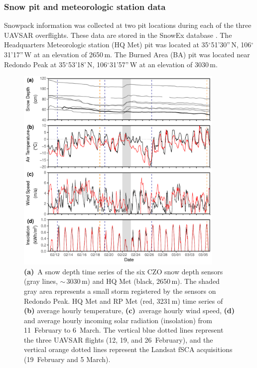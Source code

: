 \hypertarget{ch3-methods-8}{\subsubsection{Snow pit and meteorologic station data}\label{ch3-methods-8}}


Snowpack information was collected at two pit locations during each of the three UAVSAR overflights. These data are stored in the SnowEx database \citep{johnsonSnowExSnowexDb2023}. The Headquarters Meteorologic station (HQ Met) pit was located at 35$^{\circ}$51'30''\,N, 106$^{\circ}$31'17''\,W at an elevation of 2650\,m. The Burned Area (BA) pit was located near Redondo Peak at 35$^{\circ}$53'18'\,N, 106$^{\circ}$31'57''\,W at an elevation of 3030\,m.

\begin{figure}[t]
\centering
\includegraphics[width=10cm]{figures/ch3_figs/fig05.pdf}
\caption{\textbf{(a)}~A snow depth time series of the six CZO snow depth sensors (gray lines, $\sim$\,3030\,m) and HQ Met (black, 2650\,m). The shaded gray area represents a small storm registered by the sensors on Redondo Peak. HQ Met and RP Met (red, 3231\,m) time series of \textbf{(b)} average hourly temperature, \textbf{(c)}~average hourly wind speed, \textbf{(d)} and average hourly incoming solar radiation (insolation) from 11~February to 6~March. The vertical blue dotted lines represent the three UAVSAR flights (12, 19, and 26~February), and the vertical orange dotted lines represent the Landsat fSCA acquisitions (19~February and 5 March).}
\end{figure}

